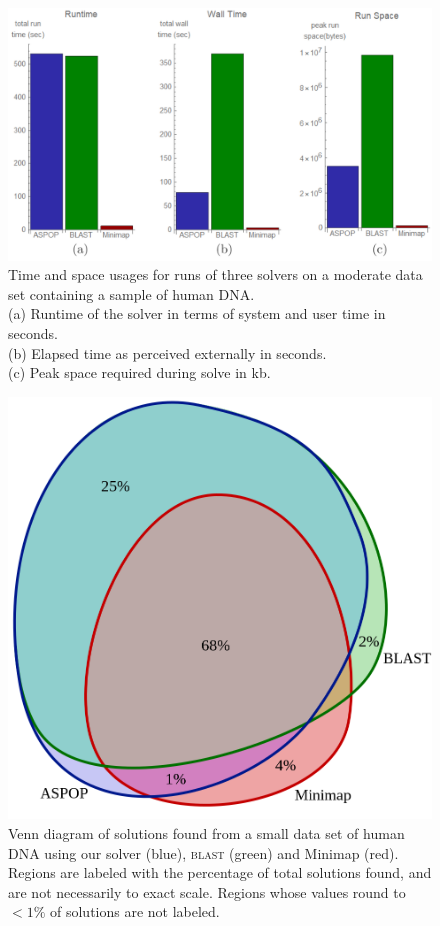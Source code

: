 \begin{figure}
\centering
\includegraphics[width=0.9\linewidth]{images/time_space_h.png}
\caption[Time and space usages for runs of three \aspop{} solvers on a moderate data set containing a sample of human DNA]{Time and space usages for runs of three \aspop{} solvers on a moderate data set containing a sample of human DNA.\\(a) Runtime of the solver in terms of system and user time in seconds.\\(b) Elapsed time as perceived externally in seconds.\\(c) Peak space required during solve in kb.}
\label{fig:human_timespace}
\end{figure}

\begin{figure}
\centering
\includegraphics[width=0.5\linewidth]{images/human_venn.png}
\caption[Venn diagram of solutions common between our \aspop{}, \textsc{blast} and Minimap for for a data set of human DNA]{Venn diagram of solutions found from a small data set of human DNA using our \aspop{} solver (blue), \textsc{blast} (green) and Minimap (red). Regions are labeled with the percentage of total solutions found, and are not necessarily to exact scale. Regions whose values round to $< 1\%$ of solutions are not labeled.}
\label{fig:human_venn}
\end{figure}





